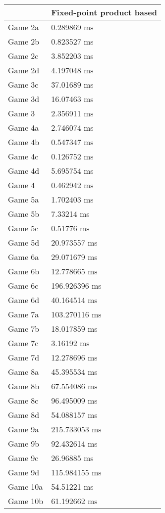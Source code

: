 \begin{tabular}{|l|l|}
	\hline
	& Fixed-point product based \\ \hline
	Game 2a & 0.289869 ms \\ \hline
	Game 2b & 0.823527 ms \\ \hline
	Game 2c & 3.852203 ms \\ \hline
	Game 2d & 4.197048 ms \\ \hline
	Game 3c & 37.01689 ms \\ \hline
	Game 3d & 16.07463 ms \\ \hline
	Game 3 & 2.356911 ms \\ \hline
	Game 4a & 2.746074 ms \\ \hline
	Game 4b & 0.547347 ms \\ \hline
	Game 4c & 0.126752 ms \\ \hline
	Game 4d & 5.695754 ms \\ \hline
	Game 4 & 0.462942 ms \\ \hline
	Game 5a & 1.702403 ms \\ \hline
	Game 5b & 7.33214 ms \\ \hline
	Game 5c & 0.51776 ms \\ \hline
	Game 5d & 20.973557 ms \\ \hline
	Game 6a & 29.071679 ms \\ \hline
	Game 6b & 12.778665 ms \\ \hline
	Game 6c & 196.926396 ms \\ \hline
	Game 6d & 40.164514 ms \\ \hline
	Game 7a & 103.270116 ms \\ \hline
	Game 7b & 18.017859 ms \\ \hline
	Game 7c & 3.16192 ms \\ \hline
	Game 7d & 12.278696 ms \\ \hline
	Game 8a & 45.395534 ms \\ \hline
	Game 8b & 67.554086 ms \\ \hline
	Game 8c & 96.495009 ms \\ \hline
	Game 8d & 54.088157 ms \\ \hline
	Game 9a & 215.733053 ms \\ \hline
	Game 9b & 92.432614 ms \\ \hline
	Game 9c & 26.96885 ms \\ \hline
	Game 9d & 115.984155 ms \\ \hline
	Game 10a & 54.51221 ms \\ \hline
	Game 10b & 61.192662 ms \\ \hline

\end{tabular}
